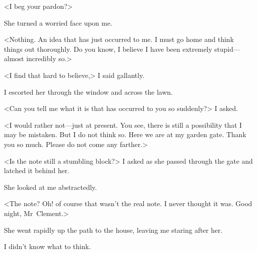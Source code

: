 <I beg your pardon?>

She turned a worried face upon me.

<Nothing. An idea that has just occurred to me. I must go home and think things out thoroughly. Do you know, I believe I have been extremely stupid—almost incredibly so.>

<I find that hard to believe,> I said gallantly.

I escorted her through the window and across the lawn.

<Can you tell me what it is that has occurred to you so suddenly?> I asked.

<I would rather not—just at present. You see, there is still a possibility that I may be mistaken. But I do not think so. Here we are at my garden gate. Thank you so much. Please do not come any farther.>

<Is the note still a stumbling block?> I asked as she passed through the gate and latched it behind her.

She looked at me abstractedly.

<The note? Oh! of course that wasn't the real note. I never thought it was. Good night, Mr~Clement.>

She went rapidly up the path to the house, leaving me staring after her.

I didn't know what to think.